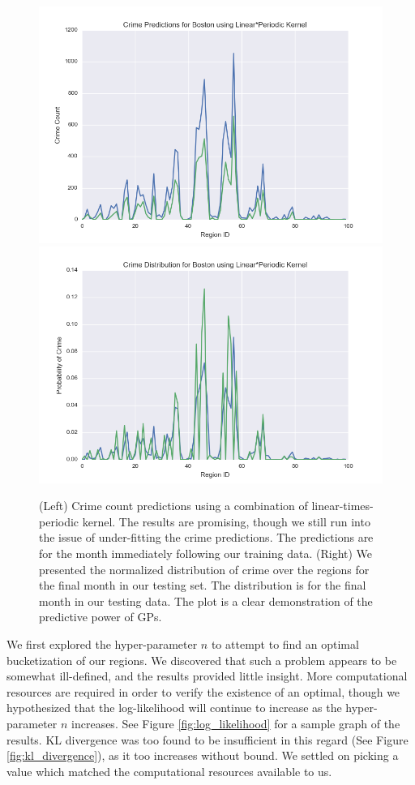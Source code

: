 \documentclass[letterpaper, 11 pt, conference]{ieeeconf}  %
\begin{document}
\begin{figure}
\centering
\includegraphics[scale=0.2]{predicted_lin_per_count}
\includegraphics[scale=0.2]{predicted_dist_lin_per_count}
\caption{(Left) Crime count predictions using a combination of linear-times-periodic kernel. The results are promising, though we still run into the issue of under-fitting the crime predictions. The predictions are for the month immediately following our training data. (Right) We presented the normalized distribution of crime over the regions for the final month in our testing set. The distribution is for the final month in our testing data. The plot is a clear demonstration of the predictive power of GPs.}
\label{fig:predictive_results_boston}
\end{figure}

We first explored the hyper-parameter $n$ to attempt to find an optimal bucketization of our regions. We discovered that such a problem appears to be somewhat ill-defined, and the results provided little insight. More computational resources are required in order to verify the existence of an optimal, though we hypothesized that the log-likelihood will continue to increase as the hyper-parameter $n$ increases. See Figure \ref{fig:log_likelihood} for a sample graph of the results. KL divergence was too found to be insufficient in this regard (See Figure \ref{fig:kl_divergence}), as it too increases without bound. We settled on picking a value which matched the computational resources available to us. 
\end{document}
